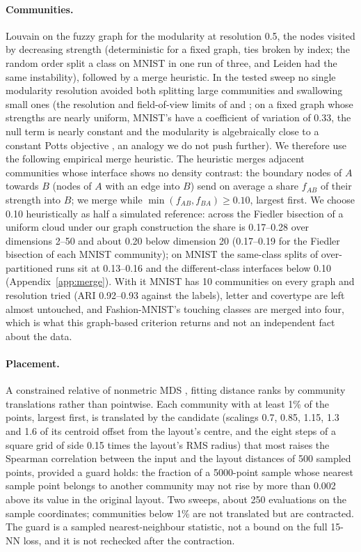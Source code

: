 \documentclass[10pt,twocolumn]{article}
\newcommand{\knn}{15-NN}
\begin{document}
\paragraph{Communities.} Louvain \citep{blondel2008louvain} on the fuzzy graph for the modularity
\citep{newman2004modularity} at resolution 0.5, the nodes visited by decreasing strength (deterministic for a
fixed graph, ties broken by index; the random order split a class on MNIST in one run of three, and Leiden
\citep{traag2019leiden} had the same instability), followed by a merge heuristic. In the tested sweep no single modularity resolution avoided both splitting large communities and
swallowing small ones (the resolution and field-of-view limits of \citet{fortunato2007resolution} and
\citet{schaub2012markov}; on a fixed graph whose strengths are nearly uniform, MNIST's have a coefficient of
variation of 0.33, the null term is nearly constant and the modularity is algebraically close to a constant Potts
objective \citep{traag2011cpm}, an analogy we do not push further). We therefore use the following empirical merge
heuristic. The heuristic merges
adjacent communities whose interface shows no density contrast: the boundary nodes of $A$ towards $B$ (nodes of
$A$ with an edge into $B$) send on average a share $f_{AB}$ of their strength into $B$; we merge while
$\min(f_{AB}, f_{BA}) \ge 0.10$, largest first. We choose 0.10 heuristically as half a simulated reference: across
the Fiedler bisection of a uniform cloud under our graph construction the share is 0.17--0.28 over dimensions
2--50 and about 0.20 below dimension 20 (0.17--0.19 for the Fiedler bisection of each MNIST community); on MNIST
the same-class splits of over-partitioned runs sit at 0.13--0.16 and the different-class interfaces below 0.10
(Appendix~\ref{app:merge}). With it MNIST has 10 communities on every graph and resolution tried (ARI 0.92--0.93
against the labels), letter and covertype are left almost untouched, and Fashion-MNIST's touching classes are
merged into four, which is what this graph-based criterion returns and not an independent fact about the data.

\paragraph{Placement.} A constrained relative of nonmetric MDS \citep{kruskal1964mds}, fitting distance ranks by
community translations rather than pointwise. Each community with at least 1\% of the points, largest first, is
translated by the candidate (scalings 0.7, 0.85, 1.15, 1.3 and 1.6 of its centroid offset from the layout's centre,
and the eight steps of a square grid of side 0.15 times the layout's RMS radius) that most raises the Spearman
correlation between the input and the layout distances of 500 sampled points, provided a guard holds: the fraction
of a 5000-point sample whose nearest sample point belongs to another community may not rise by more than 0.002
above its value in the original layout. Two sweeps, about 250 evaluations on the sample coordinates; communities below 1\% are not translated but are
contracted. The guard is a sampled nearest-neighbour statistic, not a bound on the full \knn{} loss, and it is not
rechecked after the contraction.
\end{document}
